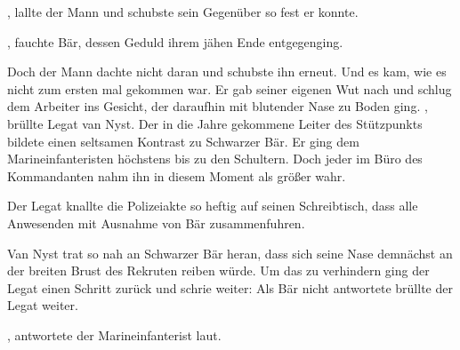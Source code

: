 , lallte der Mann und schubste sein Gegenüber so fest er konnte. 

\par

, fauchte Bär, dessen Geduld ihrem jähen Ende entgegenging.

\par

Doch der Mann dachte nicht daran und schubste ihn erneut. Und es kam, wie es nicht zum ersten mal gekommen war. Er gab seiner eigenen Wut nach und schlug dem Arbeiter ins Gesicht, der daraufhin mit blutender Nase zu Boden ging.
\ortswechsel
{}, brüllte Legat van Nyst. Der in die Jahre gekommene Leiter des Stützpunkts bildete einen seltsamen Kontrast zu Schwarzer Bär. Er ging dem Marineinfanteristen höchstens bis zu den Schultern. Doch jeder im Büro des Kommandanten nahm ihn in diesem Moment als größer wahr.

\par

 Der Legat knallte die Polizeiakte so heftig auf seinen Schreibtisch, dass alle Anwesenden mit Ausnahme von Bär zusammenfuhren. 

\par

Van Nyst trat so nah an Schwarzer Bär heran, dass sich seine Nase demnächst an der breiten Brust des Rekruten reiben würde. Um das zu verhindern ging der Legat einen Schritt zurück und schrie weiter:  Als Bär nicht antwortete brüllte der Legat weiter. 

\par

, antwortete der Marineinfanterist laut. 

